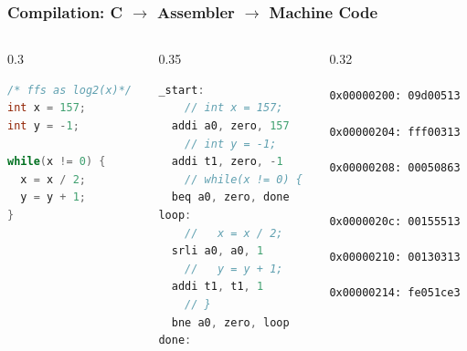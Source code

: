 \documentclass[aspectratio=169]{beamer}
\begin{document}
\begin{frame}[fragile,shrink=10]
\frametitle{Compilation: C $\to$ Assembler $\to$ Machine Code}

\begin{columns}
\begin{column}{0.3\textwidth}
\begin{lstlisting}[language={C},columns=flexible]
/* ffs as log2(x)*/
int x = 157;
int y = -1;

while(x != 0) {
  x = x / 2;
  y = y + 1;
}
\end{lstlisting}
\end{column}

\begin{column}{0.35\textwidth}
\begin{lstlisting}[language={C},columns=flexible]
_start:
    // int x = 157;
  addi a0, zero, 157
    // int y = -1;
  addi t1, zero, -1
    // while(x != 0) {
  beq a0, zero, done
loop:
    //   x = x / 2;
  srli a0, a0, 1
    //   y = y + 1;
  addi t1, t1, 1
    // }
  bne a0, zero, loop
done:
\end{lstlisting}
\end{column}

\begin{column}{0.32\textwidth}
\texttt{\phantom{x} \\
\phantom{x} \\
0x00000200:  09d00513\\
\phantom{x} \\
0x00000204:  fff00313\\
\phantom{x} \\
0x00000208:  00050863\\
\phantom{x} \\
\phantom{x} \\
0x0000020c:  00155513\\
\phantom{x} \\
0x00000210:  00130313\\
\phantom{x} \\
0x00000214:  fe051ce3 \\
\phantom{x} }
\end{column}

\end{columns}

\end{frame}
\end{document}
